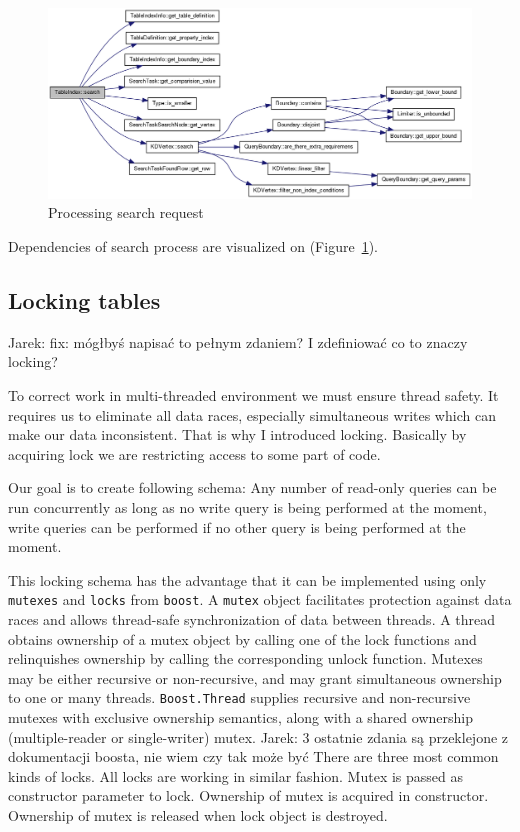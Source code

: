 \documentclass[10pt,a4paper]{article}
\newcommand{\jarek}[1]{\noindent\colorbox{myYellow}{Jarek: #1}}
\begin{document}
\begin{figure}
\centering
  \includegraphics[width=16cm]{search}
  \caption{Processing search request}
  \label{fig:search}
\end{figure}

Dependencies of search process are visualized on (Figure~\ref{fig:search}).

\subsection{Locking tables}

\jarek{fix: mógłbyś napisać to pełnym zdaniem? I zdefiniować co to znaczy locking?}

To correct work in multi-threaded environment we must ensure thread safety. It requires us to eliminate all data races, especially simultaneous writes which can make our data inconsistent. That is why I introduced locking. Basically by acquiring lock we are restricting access to some part of code. 

Our goal is to create following schema: Any number of read-only queries can be run concurrently as long as no write query is being performed at the moment, write queries can be performed if no other query is being performed at the moment. 

This locking schema has the advantage that it can be implemented using only \verb|mutexes| and \verb|locks| from \verb|boost|. A \verb|mutex| object facilitates protection against data races and allows thread-safe synchronization of data between threads. A thread obtains ownership of a mutex object by calling one of the lock functions and relinquishes ownership by calling the corresponding unlock function. Mutexes may be either recursive or non-recursive, and may grant simultaneous ownership to one or many threads. \verb|Boost.Thread| supplies recursive and non-recursive mutexes with exclusive ownership semantics, along with a shared ownership (multiple-reader or single-writer) mutex. \jarek{3 ostatnie zdania są przeklejone z dokumentacji boosta, nie wiem czy tak może być}
There are three most common kinds of locks. All locks are working in similar fashion. Mutex is passed as constructor parameter to lock. Ownership of mutex is acquired in constructor. Ownership of mutex is released when lock object is destroyed.  
\end{document}
